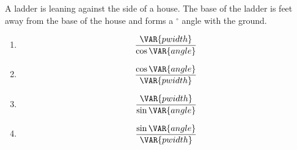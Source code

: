 A ladder is leaning against the side of a house. The base of the ladder is  \space feet away from the base of the house and forms a $^{\circ}$ angle with the ground. 
\newline
\begin{enumerate}
  \item
    \[\frac{\VAR{pwidth}}{\cos \VAR{angle}}\]
  \item
    \[\frac{\cos \VAR{angle}}{\VAR{pwidth}}\]
  \item
    \[\frac{\VAR{pwidth}}{\sin \VAR{angle}}\]
  \item
    \[\frac{\sin \VAR{angle}}{\VAR{pwidth}}\]
\end{enumerate}